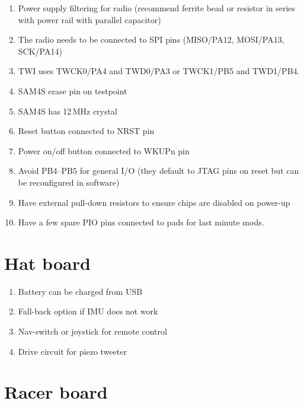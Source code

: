 \documentclass[a4paper, 12pt]{article}
\begin{document}
\begin{enumerate}
\item Power supply filtering for radio (recommend ferrite bead or
  resistor in series with power rail with parallel capacitor)

\item The radio needs to be connected to SPI pins (MISO/PA12,
  MOSI/PA13, SCK/PA14)

\item TWI uses TWCK0/PA4 and TWD0/PA3 or TWCK1/PB5 and TWD1/PB4.

\item SAM4S erase pin on testpoint

\item SAM4S has 12\,MHz crystal

\item Reset button connected to NRST pin

\item Power on/off button connected to WKUPn pin

\item Avoid PB4--PB5 for general I/O (they default to JTAG pins on
  reset but can be reconfigured in software)

\item Have external pull-down resistors to ensure chips are disabled on
  power-up

\item Have a few spare PIO pins connected to pads for last minute mods.

\end{enumerate}


\section{Hat board}

\begin{enumerate}
\item Battery can be charged from USB

\item Fall-back option if IMU does not work

\item Nav-switch or joystick for remote control

\item Drive circuit for piezo tweeter


\end{enumerate}

\section{Racer board}
\end{document}
